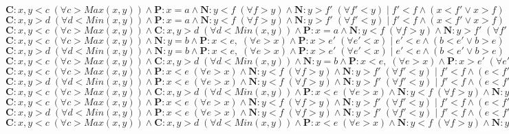 \documentclass[a4paper]{article}
\begin{document}
\begin{landscape}
\noindent$\mathbf{C}:x,y<c\; (\forall c>Max(x,y))\wedge \mathbf{P}:x=a\wedge \mathbf{N}:y<f\;(\forall f>y)\wedge \mathbf{N}:y>f'\;(\forall f'<y)\;|\; f'<f\wedge (x<f'\vee x>f)$\\
$\mathbf{C}:x,y>d\; (\forall d<Min(x,y))\wedge \mathbf{P}:x=a\wedge \mathbf{N}:y<f\;(\forall f>y)\wedge \mathbf{N}:y>f'\;(\forall f'<y)\;|\; f'<f\wedge (x<f'\vee x>f)$\\
$\mathbf{C}:x,y<c\; (\forall c>Max(x,y))\wedge \mathbf{C}:x,y>d\; (\forall d<Min(x,y))\wedge \mathbf{P}:x=a\wedge \mathbf{N}:y<f\;(\forall f>y)\wedge \mathbf{N}:y>f'\;(\forall f'<y)\;|\; f'<f\wedge (x<f'\vee x>f)$\\

\noindent$\mathbf{C}:x,y<c\; (\forall c>Max(x,y))\wedge \mathbf{N}:y=b\wedge \mathbf{P}:x<e,\; (\forall e>x)\wedge \mathbf{P}:x>e'\; (\forall e'<x)\;|\; e'<e\wedge (b<e'\vee b>e)$\\
$\mathbf{C}:x,y>d\; (\forall d<Min(x,y))\wedge \mathbf{N}:y=b\wedge \mathbf{P}:x<e,\; (\forall e>x)\wedge \mathbf{P}:x>e'\; (\forall e'<x)\;|\; e'<e\wedge (b<e'\vee b>e)$\\
$\mathbf{C}:x,y<c\; (\forall c>Max(x,y))\wedge \mathbf{C}:x,y>d\; (\forall d<Min(x,y))\wedge \mathbf{N}:y=b\wedge \mathbf{P}:x<e,\; (\forall e>x)\wedge \mathbf{P}:x>e'\; (\forall e'<x)\;|\; e'<e\wedge (b<e'\vee b>e)$\\

\noindent$\mathbf{C}:x,y<c\; (\forall c>Max(x,y))\wedge \mathbf{P}:x<e\; (\forall e>x)\wedge \mathbf{N}:y<f\; (\forall f>y)\wedge \mathbf{N}:y>f'\; (\forall f'<y)\;|\; f'<f\wedge (e<f')$\\
$\mathbf{C}:x,y>d\; (\forall d<Min(x,y))\wedge \mathbf{P}:x<e\; (\forall e>x)\wedge \mathbf{N}:y<f\; (\forall f>y)\wedge \mathbf{N}:y>f'\; (\forall f'<y)\;|\; f'<f\wedge (e<f')$\\
$\mathbf{C}:x,y<c\; (\forall c>Max(x,y))\wedge \mathbf{C}:x,y>d\; (\forall d<Min(x,y))\wedge \mathbf{P}:x<e\; (\forall e>x)\wedge \mathbf{N}:y<f\; (\forall f>y)\wedge \mathbf{N}:y>f'\; (\forall f'<y)\;|\; f'<f\wedge (e<f')$\\

\noindent$\mathbf{C}:x,y<c\; (\forall c>Max(x,y))\wedge \mathbf{P}:x<e\; (\forall e>x)\wedge \mathbf{N}:y<f\; (\forall f>y)\wedge \mathbf{N}:y>f'\; (\forall f'<y)\;|\; f'<f\wedge (e<f')$\\
$\mathbf{C}:x,y>d\; (\forall d<Min(x,y))\wedge \mathbf{P}:x<e\; (\forall e>x)\wedge \mathbf{N}:y<f\; (\forall f>y)\wedge \mathbf{N}:y>f'\; (\forall f'<y)\;|\; f'<f\wedge (e<f')$\\
$\mathbf{C}:x,y<c\; (\forall c>Max(x,y))\wedge \mathbf{C}:x,y>d\; (\forall d<Min(x,y))\wedge \mathbf{P}:x<e\; (\forall e>x)\wedge \mathbf{N}:y<f\; (\forall f>y)\wedge \mathbf{N}:y>f'\; (\forall f'<y)\;|\; f'<f\wedge (e<f')$\\


\end{landscape}
\end{document}

